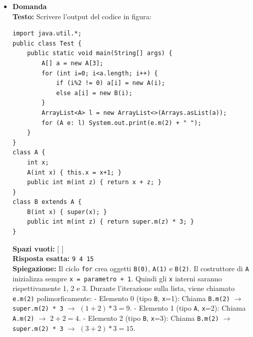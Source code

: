 \documentclass[12pt, a4paper]{article}
\begin{document}
\begin{itemize}
    \item {}\textbf{Domanda \thedomanda} \\
    \textbf{Testo:} Scrivere l'output del codice in figura:
\begin{verbatim}
import java.util.*;
public class Test {
    public static void main(String[] args) {
        A[] a = new A[3];
        for (int i=0; i<a.length; i++) {
            if (i%2 != 0) a[i] = new A(i);
            else a[i] = new B(i);
        }
        ArrayList<A> l = new ArrayList<>(Arrays.asList(a));
        for (A e: l) System.out.print(e.m(2) + " ");
    }
}
class A {
    int x;
    A(int x) { this.x = x+1; }
    public int m(int z) { return x + z; }
}
class B extends A {
    B(int x) { super(x); }
    public int m(int z) { return super.m(z) * 3; }
}
\end{verbatim}
    \textbf{Spazi vuoti:} [ \hspace{2cm} ] \\
    \textbf{Risposta esatta:} \texttt{9 4 15} \\
    \textbf{Spiegazione:} Il ciclo \texttt{for} crea oggetti \texttt{B(0)}, \texttt{A(1)} e \texttt{B(2)}. Il costruttore di \texttt{A} inizializza sempre \texttt{x = parametro + 1}. Quindi gli \texttt{x} interni saranno rispettivamente 1, 2 e 3.
    Durante l'iterazione sulla lista, viene chiamato \texttt{e.m(2)} polimorficamente:
    - Elemento 0 (tipo \texttt{B}, \texttt{x}=1): Chiama \texttt{B.m(2)} $\rightarrow$ \texttt{super.m(2) * 3} $\rightarrow$ $(1+2) * 3 = 9$.
    - Elemento 1 (tipo \texttt{A}, \texttt{x}=2): Chiama \texttt{A.m(2)} $\rightarrow$ $2+2 = 4$.
    - Elemento 2 (tipo \texttt{B}, \texttt{x}=3): Chiama \texttt{B.m(2)} $\rightarrow$ \texttt{super.m(2) * 3} $\rightarrow$ $(3+2) * 3 = 15$.
    \vspace{0.5cm}

\newpage


\end{itemize}
\end{document}
